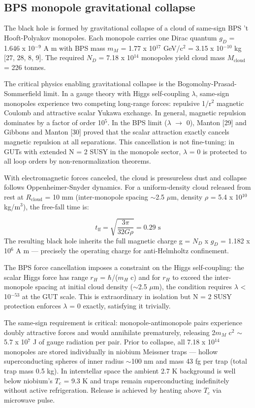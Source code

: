 \documentclass[12pt,a4paper]{article}
\begin{document}
\subsection{BPS monopole gravitational collapse}
The black hole is formed by gravitational collapse of a cloud of same-sign BPS 't Hooft-Polyakov monopoles. Each monopole carries one Dirac quantum $g_D$ = 1.646 x 10$^{-9}$ A m with BPS mass $m_M$ = 1.77 x 10$^{17}$ GeV/c$^{2}$ = 3.15 x 10$^{-10}$ kg [27, 28, 8, 9]. The required $N_D$ = 7.18 x 10$^{14}$ monopoles yield cloud mass $M_{\text{cloud}}$ = 226 tonnes.

The critical physics enabling gravitational collapse is the Bogomolny-Prasad-Sommerfield limit. In a gauge theory with Higgs self-coupling $\lambda$, same-sign monopoles experience two competing long-range forces: repulsive 1/r$^{2}$ magnetic Coulomb and attractive scalar Yukawa exchange. In general, magnetic repulsion dominates by a factor of order 10$^{5}$. In the BPS limit ($\lambda$ $\to$ 0), Manton [29] and Gibbons and Manton [30] proved that the scalar attraction exactly cancels magnetic repulsion at all separations. This cancellation is not fine-tuning: in GUTs with extended N = 2 SUSY in the monopole sector, $\lambda$ = 0 is protected to all loop orders by non-renormalization theorems.

With electromagnetic forces canceled, the cloud is pressureless dust and collapse follows Oppenheimer-Snyder dynamics. For a uniform-density cloud released from rest at $R_{\text{cloud}}$ = 10 mm (inter-monopole spacing $\sim$2.5 $\mu$m, density $\rho$ = 5.4 x 10$^{10}$ kg/m$^{3}$), the free-fall time is:

\begin{equation}
t_\text{ff} = \sqrt{\frac{3\pi}{32 G\rho}} = 0.29 \text{ s}
\end{equation}
The resulting black hole inherits the full magnetic charge g = $N_D$ x $g_D$ = 1.182 x 10$^{6}$ A m --- precisely the operating charge for anti-Helmholtz confinement.

The BPS force cancellation imposes a constraint on the Higgs self-coupling: the scalar Higgs force has range $r_H$ = $\hbar$/($m_H$ c) and for $r_H$ to exceed the inter-monopole spacing at initial cloud density ($\sim$2.5 $\mu$m), the condition requires $\lambda$ < 10$^{-53}$ at the GUT scale. This is extraordinary in isolation but N = 2 SUSY protection enforces $\lambda$ = 0 exactly, satisfying it trivially.

The same-sign requirement is critical: monopole-antimonopole pairs experience doubly attractive forces and would annihilate prematurely, releasing 2$m_M$ c$^{2}$ $\sim$ 5.7 x 10$^{7}$ J of gauge radiation per pair. Prior to collapse, all 7.18 x 10$^{14}$ monopoles are stored individually in niobium Meissner traps --- hollow superconducting spheres of inner radius $\sim$100 nm and mass 43 fg per trap (total trap mass 0.5 kg). In interstellar space the ambient 2.7 K background is well below niobium's $T_c$ = 9.3 K and traps remain superconducting indefinitely without active refrigeration. Release is achieved by heating above $T_c$ via microwave pulse.
\end{document}
